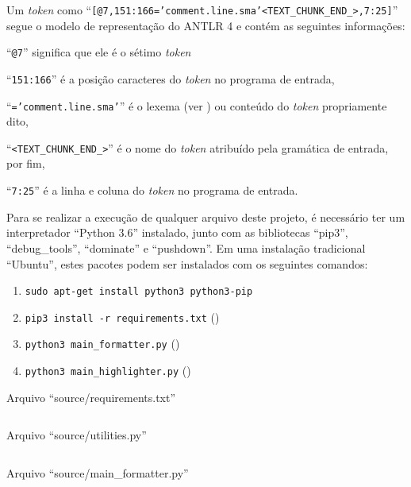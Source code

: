 Um \textit{token} como ``\texttt{[@7,151:166='comment.line.sma'<TEXT_CHUNK_END_>,7:25]}'' segue o modelo de representação do ANTLR 4 \cite{antlrBookTerrentParr} e
contém as seguintes informações:
\begin{inparaenum}[1)]
\item ``\texttt{@7}'' significa que ele é o sétimo \textit{token}
\item ``\texttt{151:166}'' é a posição caracteres do \textit{token} no programa de entrada,
\item ``\texttt{='comment.line.sma'}'' é o lexema (ver ) ou
conteúdo do \textit{token} propriamente dito,
\item ``\texttt{<TEXT_CHUNK_END_>}'' é o nome do \textit{token} atribuído pela gramática de entrada,
por fim,
\item ``\texttt{7:25}'' é a linha e
coluna do \textit{token} no programa de entrada.
\end{inparaenum}%

Para se realizar a execução de qualquer arquivo deste projeto,
é necessário ter um interpretador ``Python 3.6'' instalado,
junto com as bibliotecas ``pip3'',
``debug\_tools'', ``dominate'' e
``pushdown''.
Em uma instalação tradicional ``Ubuntu'',
estes pacotes podem ser instalados com os seguintes comandos:
\begin{enumerate}[1)]
\item \texttt{sudo apt-get install python3 python3-pip}
\item \texttt{pip3 install -r requirements.txt} ()
\item \texttt{python3 main_formatter.py} ()
\item \texttt{python3 main_highlighter.py} ()
\end{enumerate}

\begin{code}
\caption{Arquivo ``source/requirements.txt''}
\label{requirementsTxt}
\inputminted{python3}{../source/requirements.txt}
\end{code}

\begin{code}
\caption{Arquivo ``source/utilities.py''}
\label{utilitiesPy}
\inputminted{python3}{../source/utilities.py}
\end{code}

\begin{code}
\caption{Arquivo ``source/main\_formatter.py''}
\label{MainFormatterPy}
\inputminted{python3}{../source/main_formatter.py}
\end{code}


